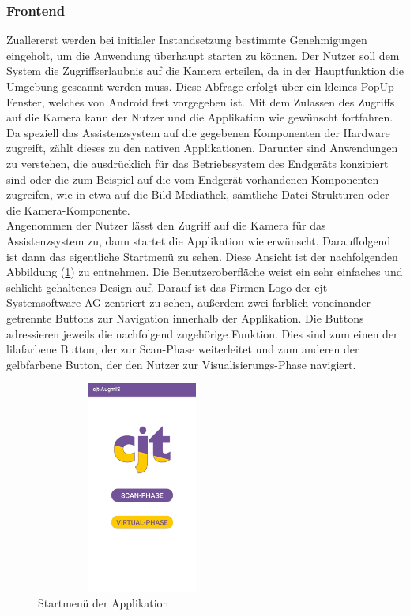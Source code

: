 \subsubsection{Frontend}
Zuallererst werden bei initialer Instandsetzung bestimmte Genehmigungen eingeholt, um die Anwendung überhaupt starten zu können. Der Nutzer soll dem System 
die Zugriffserlaubnis auf die Kamera erteilen, da in der Hauptfunktion die Umgebung gescannt werden muss. 
Diese Abfrage erfolgt über ein kleines PopUp-Fenster, welches von Android fest vorgegeben ist. 
Mit dem Zulassen des Zugriffs auf die Kamera kann der Nutzer und die Applikation wie gewünscht fortfahren. 
\\ 
\linebreak
Da speziell das Assistenzsystem auf die gegebenen Komponenten der Hardware zugreift, zählt dieses zu den nativen Applikationen. 
Darunter sind Anwendungen zu verstehen, die ausdrücklich für das Betriebssystem des Endgeräts konzipiert sind oder die zum Beispiel auf die vom Endgerät vorhandenen 
Komponenten zugreifen, wie in etwa auf die Bild-Mediathek, sämtliche Datei-Strukturen oder die Kamera-Komponente.
\\ 
\linebreak
Angenommen der Nutzer lässt den Zugriff auf die Kamera für das Assistenzsystem zu, dann startet die Applikation wie erwünscht. Darauffolgend ist dann 
das eigentliche Startmenü zu sehen. Diese Ansicht ist der nachfolgenden Abbildung (\ref{pic:startmenu}) zu entnehmen. Die Benutzeroberfläche weist ein sehr einfaches und 
schlicht gehaltenes Design auf. 
Darauf ist das Firmen-Logo der cjt Systemsoftware AG zentriert zu sehen, außerdem zwei farblich voneinander getrennte Buttons zur Navigation innerhalb der Applikation. 
Die Buttons adressieren jeweils die nachfolgend zugehörige Funktion. Dies sind zum einen der lilafarbene Button, der zur Scan-Phase weiterleitet und zum anderen der 
gelbfarbene Button, der den Nutzer zur Visualisierungs-Phase navigiert.  
\begin{figure}[hbt!]
    \centering
    \includegraphics[width=7cm,height=7cm,keepaspectratio]{4Umsetzung/Bilder/startmenu.jpg}
    \caption{Startmenü der Applikation}
    \label{pic:startmenu}
\end{figure}
